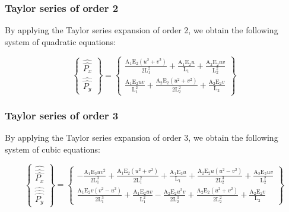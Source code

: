 \subsubsection{Taylor series of order 2}

By applying the Taylor series expansion of order 2, we obtain the following system of quadratic equations:

\begin{equation}
    \begin{Bmatrix}
        \widehat{\widehat{P_x}} \\
        \widehat{\widehat{P_y}}
    \end{Bmatrix}
    =
    \begin{Bmatrix}
        \frac{\text{A}_1 \text{E}_2 \left(u^2+v^2\right)}{2 \text{L}_1^2}+\frac{\text{A}_1 \text{E}_2 u}{\text{L}_1}+\frac{\text{A}_2 \text{E}_2 u v}{\text{L}_2^2} \\
        \frac{\text{A}_1 \text{E}_2 u v}{\text{L}_1^2}+\frac{\text{A}_2 \text{E}_2 \left(u^2+v^2\right)}{2 \text{L}_2^2}+\frac{\text{A}_2 \text{E}_2 v}{\text{L}_2}
    \end{Bmatrix}
    \label{eq:taylor_series_expansion_order_2}
\end{equation}


\subsubsection{Taylor series of order 3}

By applying the Taylor series expansion of order 3, we obtain the following system of cubic equations:

\begin{equation}
    \begin{Bmatrix}
        \widehat{\widehat{\widehat{P_x}}} \\
        \widehat{\widehat{\widehat{P_y}}}
    \end{Bmatrix}
    =
    \begin{Bmatrix}
        -\frac{\text{A}_1 \text{E}_2 u v^2}{2 \text{L}_1^3}+\frac{\text{A}_1 \text{E}_2 \left(u^2+v^2\right)}{2 \text{L}_1^2}+\frac{\text{A}_1 \text{E}_2 u}{\text{L}_1}+\frac{\text{A}_2 \text{E}_2 u \left(u^2-v^2\right)}{2 \text{L}_2^3}+\frac{\text{A}_2 \text{E}_2 u v}{\text{L}_2^2} \\
        \frac{\text{A}_1 \text{E}_2 v \left(v^2-u^2\right)}{2 \text{L}_1^3}+\frac{\text{A}_1 \text{E}_2 u v}{\text{L}_1^2}-\frac{\text{A}_2 \text{E}_2 u^2 v}{2 \text{L}_2^3}+\frac{\text{A}_2 \text{E}_2 \left(u^2+v^2\right)}{2 \text{L}_2^2}+\frac{\text{A}_2 \text{E}_2 v}{\text{L}_2}
    \end{Bmatrix}
    \label{eq:taylor_series_expansion_order_3}
\end{equation}